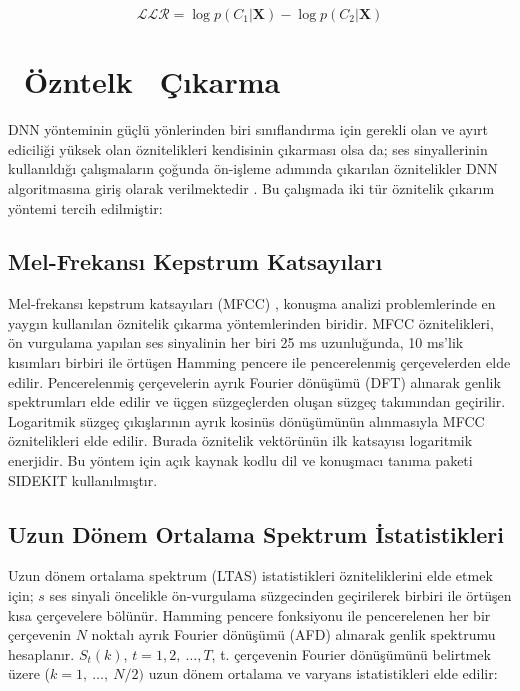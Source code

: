 \documentclass[conference, a4paper]{IEEEtran}
\begin{document}
\begin{equation}
    \mathcal{LLR}=\log p(C_1|\mathbf{X})-\log p(C_2|\mathbf{X})
\end{equation}

\section{{\ Ö}zn{}tel{}k {\ Ç}ıkarma}
DNN yönteminin güçlü yönlerinden biri sınıflandırma için gerekli olan ve ayırt ediciliği yüksek olan öznitelikleri
kendisinin çıkarması olsa da; ses sinyallerinin kullanıldığı çalışmaların çoğunda ön-işleme adımında çıkarılan
öznitelikler DNN algoritmasına giriş olarak verilmektedir \cite{nagarsheth2017replay}. Bu çalışmada iki tür öznitelik
çıkarım yöntemi tercih edilmiştir:

\subsection{Mel-Frekansı Kepstrum Katsayıları}
Mel-frekansı kepstrum katsayıları (MFCC) \cite{kinnunen2010overview,davis1980comparison}, konuşma analizi
problemlerinde en yaygın kullanılan öznitelik çıkarma yöntemlerinden biridir. MFCC öznitelikleri, ön vurgulama yapılan
ses sinyalinin her biri 25 ms uzunluğunda, 10 ms'lik kısımları birbiri ile örtüşen Hamming pencere ile pencerelenmiş
çerçevelerden elde edilir. Pencerelenmiş çerçevelerin ayrık Fourier dönüşümü (DFT) alınarak genlik spektrumları elde
edilir ve üçgen süzgeçlerden oluşan süzgeç takımından geçirilir. Logaritmik süzgeç çıkışlarının ayrık kosinüs
dönüşümünün alınmasıyla MFCC öznitelikleri elde edilir. Burada öznitelik vektörünün ilk katsayısı logaritmik enerjidir.
Bu yöntem için açık kaynak kodlu dil ve konuşmacı tanıma paketi SIDEKIT \cite{sidekit} kullanılmıştır.

\subsection{Uzun Dönem Ortalama Spektrum İstatistikleri}
Uzun dönem ortalama spektrum (LTAS) istatistikleri \cite{muckenhirn2016presentation}  özniteliklerini elde etmek için;
$s$ ses sinyali öncelikle ön-vurgulama süzgecinden geçirilerek birbiri ile örtüşen kısa çerçevelere bölünür. Hamming
pencere fonksiyonu ile pencerelenen her bir çerçevenin $N$ noktalı ayrık Fourier dönüşümü (AFD) alınarak genlik
spektrumu hesaplanır. $S_t(k)$, $t=1,2,\:\ldots,T$, t. çerçevenin Fourier dönüşümünü belirtmek üzere
($k=1,\:\ldots,\:N/2)$ uzun dönem ortalama ve varyans istatistikleri elde edilir:
\end{document}
